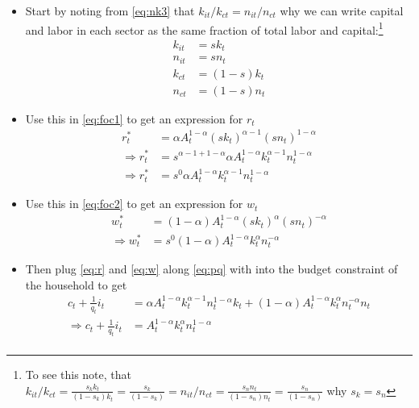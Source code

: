 \documentclass{scrartcl}
\begin{document}
\begin{itemize}

\item Start by noting from \eqref{eq:nk3} that $k_{it}/k_{ct}=n_{it}/n_{ct}$ why we can write capital and labor in each sector as the same fraction of total labor and capital:\footnote{To see this note, that $k_{it}/k_{ct}=\frac{s_k k_{t}}{(1-s_k)k_{t}}=\frac{s_k }{(1-s_k)}=n_{it}/n_{ct}=\frac{s_n n_{t}}{(1-s_n)n_{t}}=\frac{s_n }{(1-s_n)}$ why $s_k=s_n$} 
\begin{align}
k_{it}&=sk_{t} \\
n_{it}&=sn_{t} \\
k_{ct}&=(1-s)k_{t} \\
n_{ct}&=(1-s)n_{t} 
\end{align}

\item Use this in \eqref{eq:foc1} to get an expression for $r_t$ 
\begin{align}
r_t^*&=\alpha A_t^{1-\alpha} \left( s k_t \right)^{\alpha-1} \left( s n_t \right)^{1-\alpha} \nonumber \\
\Rightarrow r_t^*&= s^{\alpha-1+1-\alpha} \alpha A_t^{1-\alpha}  k_t ^{\alpha-1} n_t^{1-\alpha} \nonumber \\
\Rightarrow r_t^*&= s^{0} \alpha A_t^{1-\alpha}  k_t ^{\alpha-1} n_t^{1-\alpha} \label{eq:r} 
\end{align}

\item Use this in \eqref{eq:foc2} to get an expression for $w_t$ 
\begin{align}
w_t^*&=(1-\alpha) A_t ^{1-\alpha} \left( s k_{t} \right)^{\alpha} \left( s  n_{t} \right)^{-\alpha} \nonumber \\
\Rightarrow w_t^*&=s^{0} (1-\alpha) A_t ^{1-\alpha} k_{t}^{\alpha}   n_{t} ^{-\alpha} \label{eq:w}
\end{align}

	\item Then plug \eqref{eq:r} and \eqref{eq:w} along \eqref{eq:pq} with  into the budget constraint of the household to get
	\begin{align}
	c_t+\frac{1}{q_t} i_t&=\alpha A_t^{1-\alpha}  k_t ^{\alpha-1} n_t^{1-\alpha} k_t+  (1-\alpha) A_t ^{1-\alpha} k_{t}^{\alpha}   n_{t} ^{-\alpha} n_t \nonumber \\
	\Rightarrow c_t+\frac{1}{q_t} i_t&= A_t^{1-\alpha}  k_t ^{\alpha} n_t^{1-\alpha} \\
	\end{align}
	

\end{itemize}
\end{document}
